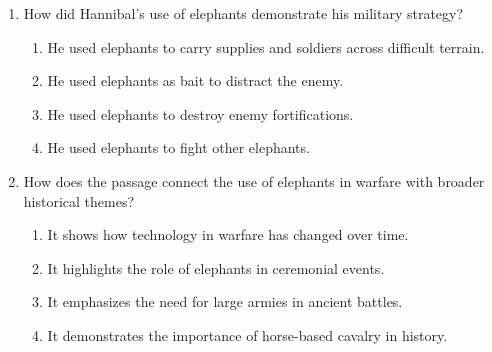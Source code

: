 \documentclass[12pt]{article}
\begin{document}
\begin{enumerate}
    \item How did Hannibal’s use of elephants demonstrate his military strategy?
    \begin{enumerate}[label=\Alph*.]
        \item He used elephants to carry supplies and soldiers across difficult terrain.
        \item He used elephants as bait to distract the enemy.
        \item He used elephants to destroy enemy fortifications.
        \item He used elephants to fight other elephants.
    \end{enumerate}
    \vspace{0.5cm}

    \item How does the passage connect the use of elephants in warfare with broader historical themes?
    \begin{enumerate}[label=\Alph*.]
        \item It shows how technology in warfare has changed over time.
        \item It highlights the role of elephants in ceremonial events.
        \item It emphasizes the need for large armies in ancient battles.
        \item It demonstrates the importance of horse-based cavalry in history.
    \end{enumerate}
    \vspace{0.5cm}

\end{enumerate}
\end{document}
